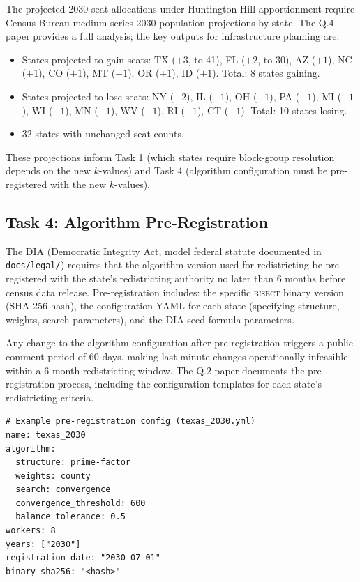 The projected 2030 seat allocations under Huntington-Hill apportionment require
Census Bureau medium-series 2030 population projections by state. The Q.4 paper
provides a full analysis; the key outputs for infrastructure planning are:

\begin{itemize}
\item States projected to gain seats: TX ($+3$, to 41), FL ($+2$, to 30), AZ ($+1$),
  NC ($+1$), CO ($+1$), MT ($+1$), OR ($+1$), ID ($+1$). Total: 8 states gaining.
\item States projected to lose seats: NY ($-2$), IL ($-1$), OH ($-1$), PA ($-1$),
  MI ($-1$), WI ($-1$), MN ($-1$), WV ($-1$), RI ($-1$), CT ($-1$). Total: 10 states losing.
\item 32 states with unchanged seat counts.
\end{itemize}

These projections inform Task 1 (which states require block-group resolution depends
on the new $k$-values) and Task 4 (algorithm configuration must be pre-registered
with the new $k$-values).

\subsection{Task 4: Algorithm Pre-Registration}

The DIA (Democratic Integrity Act, model federal statute documented in
\texttt{docs/legal/}) requires that the algorithm version used for redistricting
be pre-registered with the state's redistricting authority no later than 6 months
before census data release. Pre-registration includes: the specific \textsc{bisect}
binary version (SHA-256 hash), the configuration YAML for each state (specifying
structure, weights, search parameters), and the DIA seed formula parameters.

Any change to the algorithm configuration after pre-registration triggers a
public comment period of 60 days, making last-minute changes operationally
infeasible within a 6-month redistricting window. The Q.2 paper documents
the pre-registration process, including the configuration templates for each
state's redistricting criteria.

\begin{verbatim}
# Example pre-registration config (texas_2030.yml)
name: texas_2030
algorithm:
  structure: prime-factor
  weights: county
  search: convergence
  convergence_threshold: 600
  balance_tolerance: 0.5
workers: 8
years: ["2030"]
registration_date: "2030-07-01"
binary_sha256: "<hash>"
\end{verbatim}
